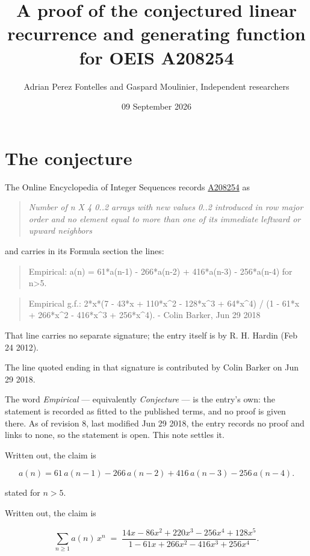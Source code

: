 \documentclass[11pt]{article}
\title{A proof of the conjectured linear recurrence and generating function for OEIS A208254}
\author{Adrian Perez Fontelles and Gaspard Moulinier, Independent researchers}
\date{09 September 2026}
\theoremstyle{definition}
\begin{document}
\maketitle
\section{The conjecture}

The Online Encyclopedia of Integer Sequences records \href{https://oeis.org/A208254}{A208254} as

\begin{quote}\itshape Number of n X 4 0..2 arrays with new values 0..2 introduced in row major order and no element equal to more than one of its immediate leftward or upward neighbors\end{quote}

and carries in its Formula section the lines:

\begin{quote}\ttfamily Empirical: a(n) = 61*a(n-1) - 266*a(n-2) + 416*a(n-3) - 256*a(n-4) for n>5.\end{quote}

\begin{quote}\ttfamily Empirical g.f.: 2*x*(7 - 43*x + 110*x\textasciicircum{}2 - 128*x\textasciicircum{}3 + 64*x\textasciicircum{}4) / (1 - 61*x + 266*x\textasciicircum{}2 - 416*x\textasciicircum{}3 + 256*x\textasciicircum{}4). - Colin Barker, Jun 29 2018\end{quote}

That line carries no separate signature; the entry itself is by R. H. Hardin (Feb 24 2012).

The line quoted ending in that signature is contributed by Colin Barker on Jun 29 2018.

The word {\itshape Empirical} --- equivalently {\itshape Conjecture} --- is the entry's own: the statement is recorded as fitted to the published terms, and no proof is given there. As of revision 8, last modified Jun 29 2018, the entry records no proof and links to none, so the statement is open. This note settles it.

Written out, the claim is

\[a(n) = 61\,a(n-1) - 266\,a(n-2) + 416\,a(n-3) - 256\,a(n-4).\]

stated for $n > 5$.

Written out, the claim is

\[\sum_{n \ge 1} a(n)\,x^n \;=\; \frac{14x - 86x^{2} + 220x^{3} - 256x^{4} + 128x^{5}}{1 - 61x + 266x^{2} - 416x^{3} + 256x^{4}}.\]
\end{document}
